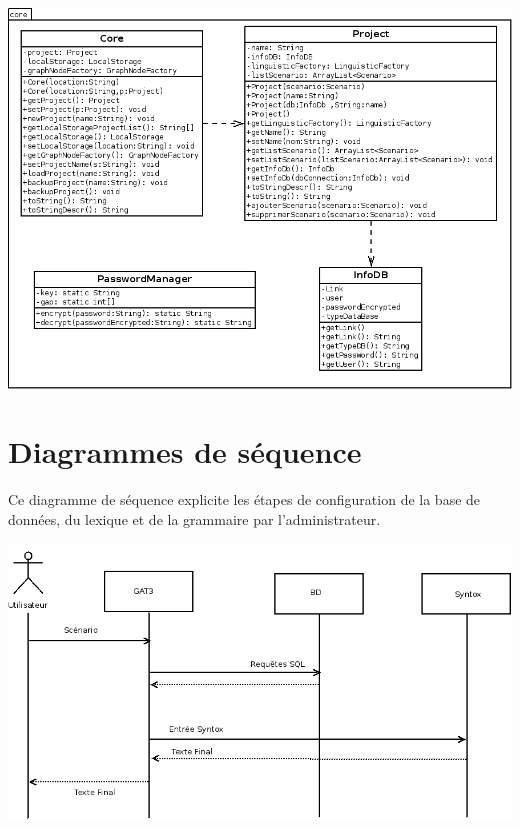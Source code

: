\documentclass[12pt]{report}
\begin{document}
\begin{center}
\includegraphics[scale=0.5]{diversuml/Core.png}
\end{center}

\section{Diagrammes de séquence}
	Ce diagramme de séquence explicite les étapes de configuration de la base de données, du lexique et de la grammaire par l'administrateur. 

	\includegraphics[scale=0.4]{diasequence2.png}
\end{document}
